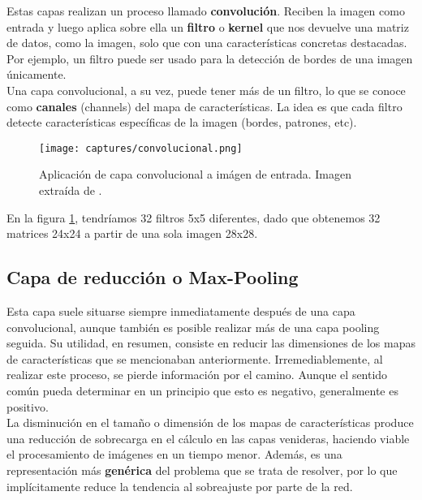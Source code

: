 \documentclass[11pt,fleqn]{book} %
\begin{document}
Estas capas realizan un proceso llamado \textbf{convolución}. Reciben la imagen como entrada y luego aplica sobre ella un \textbf{filtro} o \textbf{kernel} que nos devuelve una matriz de datos, como la imagen, solo que con una características concretas destacadas. Por ejemplo, un filtro puede ser usado para la detección de bordes de una imagen únicamente. \\

Una capa convolucional, a su vez, puede tener más de un filtro, lo que se conoce como \textbf{canales} (channels) del mapa de características. La idea es que cada filtro detecte características específicas de la imagen (bordes, patrones, etc).

\begin{figure}[H]
	\centering\texttt{[image: captures/convolucional.png]}
	\caption{Aplicación de capa convolucional a imágen de entrada. Imagen extraída de \cite{article:convimagen1}.}
	\label{fig:convolucional} %
\end{figure}

En la figura \ref{fig:convolucional}, tendríamos 32 filtros 5x5 diferentes, dado que obtenemos 32 matrices 24x24 a partir de una sola imagen 28x28.

\subsection{Capa de reducción o Max-Pooling}\label{sec:pooling}

Esta capa suele situarse siempre inmediatamente después de una capa convolucional, aunque también es posible realizar más de una capa pooling seguida. Su utilidad, en resumen, consiste en reducir las dimensiones de los mapas de características que se mencionaban anteriormente. Irremediablemente, al realizar este proceso, se pierde información por el camino. Aunque el sentido común pueda determinar en un principio que esto es negativo, generalmente es positivo. \\

La disminución en el tamaño o dimensión de los mapas de características produce una reducción de sobrecarga en el cálculo en las capas venideras, haciendo viable el procesamiento de imágenes en un tiempo menor. Además, es una representación más \textbf{genérica} del problema que se trata de resolver, por lo que implícitamente reduce la tendencia al sobreajuste por parte de la red. \\
\end{document}
